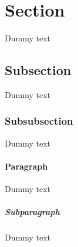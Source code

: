 \documentclass{article}
\begin{document}
  \tableofcontents{}
  \newpage

  \section{Section}
  Dummy text

  \subsection{Subsection}
  Dummy text

  \subsubsection{Subsubsection}
  Dummy text


  \paragraph{Paragraph}
  Dummy text

  \subparagraph{Subparagraph}
  Dummy text
\end{document}
